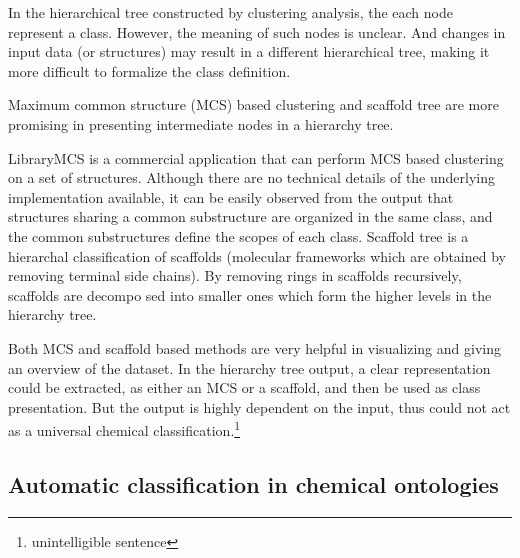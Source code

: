 \documentclass[10pt]{bmc_article}
\newenvironment{bmcformat}{\baselineskip20pt\sloppy\setboolean{publ}{false}}{\baselineskip20pt\sloppy}
\begin{document}
\begin{bmcformat}
In the hierarchical tree constructed by clustering analysis, the each node represent a class. However, the meaning of such nodes is unclear. And changes in input data (or structures) may result in a different hierarchical tree, making it more difficult to formalize the class definition. 

Maximum common structure (MCS) based clustering and scaffold tree are more promising in presenting intermediate nodes in a hierarchy tree. 

LibraryMCS\cite{librarymcs} is a commercial application that can perform MCS based clustering on a set of structures. Although there are no technical details of the underlying implementation available, it can be easily observed from the output that structures sharing a common substructure are organized in the same class, and the common substructures define the scopes of each class. Scaffold tree\cite{Schuffenhauer2007} is a hierarchal classification of scaffolds (molecular frameworks which are obtained by removing terminal side chains). By removing rings in scaffolds recursively, scaffolds are decompo sed into smaller ones which form the higher levels in the hierarchy tree. 

Both MCS and scaffold based methods are very helpful in visualizing and giving an overview of the dataset. In the hierarchy tree output, a clear representation could be extracted, as either an MCS or a scaffold, and then be used as class presentation. But the output is highly dependent on the input, thus could not act as a universal chemical classification.\footnote{unintelligible sentence} 





\subsection*{Automatic classification in chemical ontologies}
\label{sec:resultschemontology}


\end{bmcformat}
\end{document}
